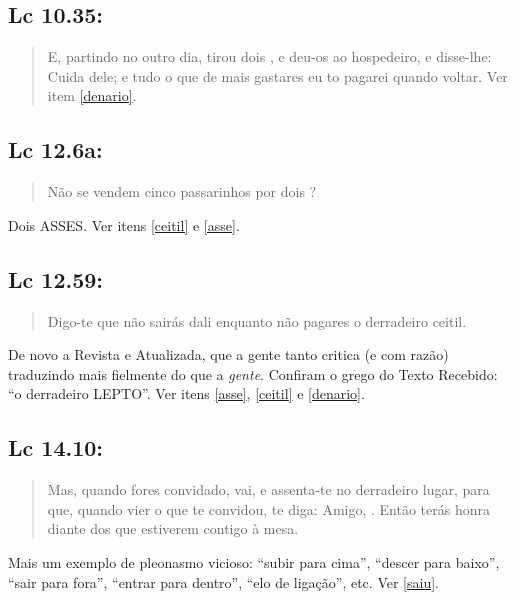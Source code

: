 \subsection*{Lc 10.35:}
\begin{quote}
    \small
E, partindo no outro dia, tirou dois , e deu-os ao hospedeiro, e disse-lhe: Cuida dele; e tudo o que de mais gastares eu to pagarei quando voltar.
Ver item \ref{denario}.
    \end{quote}

\subsection*{Lc 12.6a:}
\begin{quote}
    \small
Não se vendem cinco passarinhos por dois ?
\end{quote}

Dois ASSES. Ver itens \ref{ceitil} e \ref{asse}.

\subsection*{Lc 12.59:}
\begin{quote}
    \small
Digo-te que não sairás dali enquanto não pagares o derradeiro ceitil.
\end{quote}

De novo a Revista e Atualizada, que a gente tanto critica (e com
razão) traduzindo mais fielmente do que a \emph{gente}. Confiram o
grego do Texto Recebido: ``o derradeiro LEPTO''. Ver itens \ref{asse}, \ref{ceitil} e \ref{denario}.


\subsection*{Lc 14.10:}
\begin{quote}
    \small
Mas, quando fores convidado, vai, e assenta-te no
derradeiro lugar, para que, quando vier o que te convidou, te diga:
Amigo, . Então terás honra diante dos que estiverem
contigo à mesa.
\end{quote}

Mais um exemplo de pleonasmo vicioso: ``subir para cima'', ``descer
para baixo'', ``sair para fora'', ``entrar para dentro'', ``elo de
ligação'', etc. Ver \ref{saiu}.


